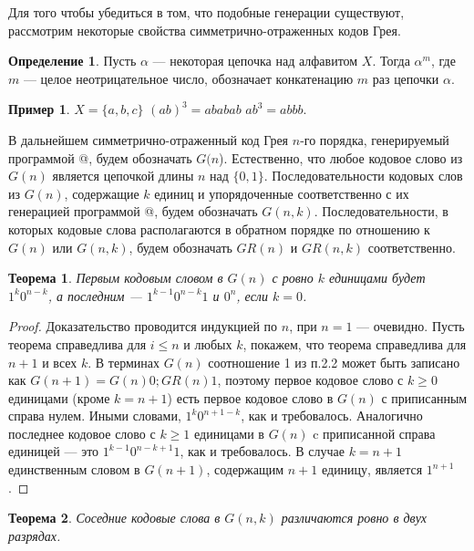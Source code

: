 \documentclass[12pt,a4paper]{article}
\theoremstyle{plain}
\newtheorem{theorem}{Теорема}
\theoremstyle{definition}
\newtheorem{definition}{Определение}
\newtheorem*{example}{Пример}
\theoremstyle{remark}
\begin{document}
Для того чтобы убедиться в том, что подобные генерации существуют, рассмотрим некоторые свойства симметрично-отраженных кодов Грея. 

\begin{definition}
Пусть $\alpha$ --- некоторая цепочка над алфавитом $X$. Тогда $\alpha^m$, где $m$ --- целое неотрицательное число, обозначает конкатенацию $m$ раз цепочки $\alpha$.
\end{definition}

\begin{example}
$X=\{a,b,c\}$ $(ab)^3=ababab$ $ab^3=abbb$.
\end{example}

В дальнейшем симметрично-отраженный код Грея $n$-го порядка, генерируемый программой @, будем обозначать $G(n$). Естественно, что любое кодовое слово из $G(n)$ является цепочкой длины $n$ над $\{0,1\}$. Последовательности кодовых слов из $G(n)$, содержащие $k$ единиц и упорядоченные соответственно с их генерацией программой @, будем обозначать $G(n,k)$. Последовательности, в которых кодовые слова располагаются в обратном порядке по отношению к $G(n)$ или $G(n,k)$, будем обозначать $GR(n)$ и $GR(n,k)$ соответственно. 

\begin{theorem}
\label{thm:4.1}
Первым кодовым словом в $G(n)$ с ровно $k$ единицами будет $1^k0^{n-k}$, а последним --- $1^{k-1}0^{n-k}1$ и $0^n$, если $k=0$.
\end{theorem}

\begin{proof}
Доказательство проводится индукцией по $n$, при $n=1$ --- очевидно. Пусть теорема справедлива для $i\le n$ и любых $k$, покажем, что теорема справедлива для $n+1$ и всех $k$. В терминах $G(n)$ соотношение {1} из п.2.2 может быть записано как $G(n+1)=G(n)0;GR(n)1$, поэтому первое кодовое слово с $k\ge 0$ единицами (кроме $k=n+1$) есть первое кодовое слово в $G(n)$ с приписанным справа нулем. Иными словами, $1^k0^{n+1-k}$, как и требовалось. Аналогично последнее кодовое слово с $k\ge 1$ единицами в $G(n)$ c приписанной справа единицей --- это $1^{k-1}0^{n-k+1}1$, как и требовалось. В случае $k=n+1$ единственным словом в $G(n+1)$, содержащим $n+1$ единицу, является $1^{n+1}$.
\end{proof}

\begin{theorem}
Соседние кодовые слова в $G(n,k)$ различаются ровно в двух разрядах.
\end{theorem}
\end{document}

